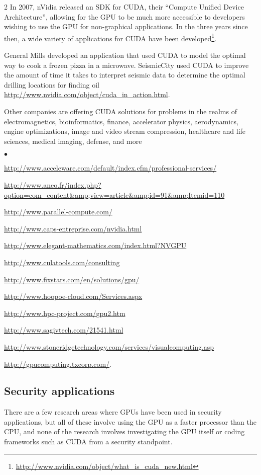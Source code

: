 \documentclass[letterpaper,10pt]{article}
\newcommand{\squishlist}{\begin{list}{$\bullet$}
  {\setlength{\itemsep}{0pt}
    \setlength{\parsep}{3pt}
    \setlength{\topsep}{3pt}
    \setlength{\partopsep}{0pt}
    \setlength{\leftmargin}{1.5em}
    \setlength{\labelwidth}{1em}
    \setlength{\labelsep}{0.5em}}}
\newcommand{\squishend}{\end{list}}
\begin{document}
\begin{multicols}{2}
  In 2007, nVidia released an SDK for CUDA, their ``Compute Unified Device
Architecture'', allowing for the GPU to be much more accessible to developers
wishing to use the GPU for non-graphical applications. In the three years since
then, a wide variety of applications for CUDA have been developed\footnote{\url{http://www.nvidia.com/object/what\_is\_cuda\_new.html}}.
  
  General Mills developed an application that used CUDA to model the optimal
way to cook a frozen pizza in a microwave. SeismicCity used CUDA to improve the
amount of time it takes to interpret seismic data to determine the optimal
drilling locations for finding oil
\url{http://www.nvidia.com/object/cuda\_in\_action.html}.
  
  Other companies are offering CUDA solutions for problems in the realms of
electromagnetics, bioinformatics, finance, accelerator physics, aerodynamics,
engine optimizations, image and video stream compression, healthcare and life
sciences, medical imaging, defense, and more
\squishlist
\item \url{http://www.acceleware.com/default/index.cfm/professional-services/}
\item \url{http://www.aneo.fr/index.php?option=com\_content&amp;view=article&amp;id=91&amp;Itemid=110}
\item \url{http://www.parallel-compute.com/}
\item \url{http://www.caps-entreprise.com/nvidia.html}
\item \url{http://www.elegant-mathematics.com/index.html?NVGPU}
\item \url{http://www.culatools.com/consulting}
\item \url{http://www.fixstars.com/en/solutions/gpu/}
\item \url{http://www.hoopoe-cloud.com/Services.aspx}
\item \url{http://www.hpc-project.com/gpu2.htm}
\item \url{http://www.sagivtech.com/21541.html}
\item \url{http://www.stoneridgetechnology.com/services/visualcomputing.asp}
\item \url{http://gpucomputing.txcorp.com/}.
\squishend
  
\subsection{Security applications}
  There are a few research areas where GPUs have been used in security applications, but all of these involve using the GPU as a faster processor than the CPU, and none of the research involves investigating the GPU itself or coding frameworks such as CUDA from a security standpoint.
  

\end{multicols}
\end{document}

